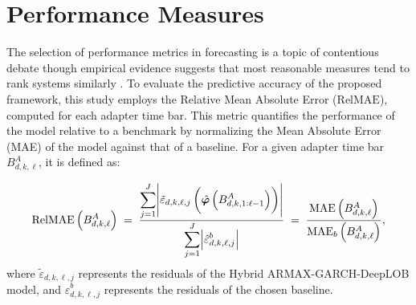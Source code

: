 \documentclass[10pt,a4paper,oneside]{article}
\DeclarePairedDelimiter{\aval}{\lvert}{\rvert} %
\begin{document}

\section{Performance Measures}
\label{sec:performance_measures}

The selection of performance metrics in forecasting is a topic of contentious debate though empirical evidence suggests that most reasonable measures tend to rank systems similarly \cite{Koutsandreas2021}. To evaluate the predictive accuracy of the proposed framework, this study employs the Relative Mean Absolute Error ($\mathrm{RelMAE}$), computed for each adapter time bar. This metric quantifies the performance of the model relative to a benchmark by normalizing the Mean Absolute Error (MAE) of the model against that of a baseline. For a given adapter time bar $B^A_{d, k, \ell}$, it is defined as:

\[
    \mathrm{RelMAE}\left( B^A_{d, k, \ell} \right)
    \;=\;
    \frac{\displaystyle\sum_{j=1}^{J} \aval*{\tilde{\varepsilon}_{d, k, \ell, j}\left( \hat{\boldsymbol{\varphi}} \left( B^A_{d,k,1:\ell - 1} \right) \right)}}{\displaystyle\sum_{j=1}^{J} \aval*{\hat{\varepsilon}^b_{d, k, \ell, j}}}
    \;=\;
    \frac{\mathrm{MAE}\left( B^A_{d, k, \ell} \right)}{\mathrm{MAE}_{b}\left( B^A_{d, k, \ell} \right)},
\]
where $\tilde{\varepsilon}_{d, k, \ell, j}$ represents the residuals of the Hybrid ARMAX-GARCH-DeepLOB model, and $\hat{\varepsilon}^b_{d, k, \ell, j}$ represents the residuals of the chosen baseline.
\end{document}
